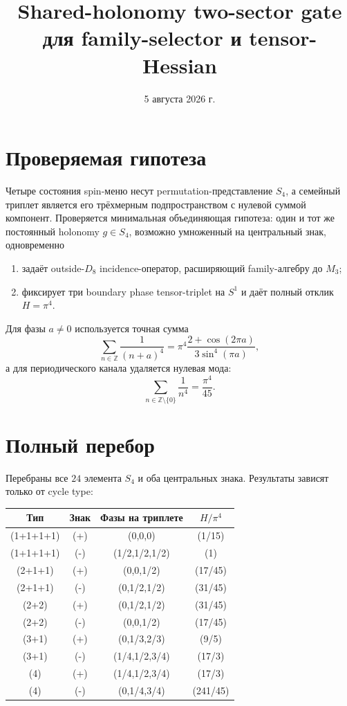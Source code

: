 \documentclass[12pt,a4paper]{article}
\title{Shared-holonomy two-sector gate\\
для family-selector и tensor-Hessian}
\author{}
\date{5 августа 2026 г.}
\begin{document}
\maketitle

\section{Проверяемая гипотеза}

Четыре состояния spin-меню несут permutation-представление \(S_4\), а
семейный триплет является его трёхмерным подпространством с нулевой суммой
компонент. Проверяется минимальная объединяющая гипотеза: один и тот же
постоянный holonomy \(g\in S_4\), возможно умноженный на центральный знак,
одновременно
\begin{enumerate}
    \item задаёт outside-\(D_8\) incidence-оператор, расширяющий family-алгебру
    до \(M_3\);
    \item фиксирует три boundary phase tensor-triplet на \(S^1\) и даёт
    полный отклик \(H=\pi^4\).
\end{enumerate}

Для фазы \(a\ne0\) используется точная сумма
\begin{equation}
 \sum_{n\in\mathbb Z}\frac1{(n+a)^4}
 =\pi^4\frac{2+\cos(2\pi a)}{3\sin^4(\pi a)},
\end{equation}
а для периодического канала удаляется нулевая мода:
\begin{equation}
 \sum_{n\in\mathbb Z\setminus\{0\}}\frac1{n^4}=\frac{\pi^4}{45}.
\end{equation}

\section{Полный перебор}

Перебраны все \(24\) элемента \(S_4\) и оба центральных знака. Результаты
зависят только от cycle type:
\begin{center}
\begin{tabular}{cccc}
\toprule
Тип & Знак & Фазы на триплете & \(H/\pi^4\) \\
\midrule
(1+1+1+1) & (+) & (0,0,0) & (1/15) \\
(1+1+1+1) & (-) & (1/2,1/2,1/2) & (1) \\
(2+1+1) & (+) & (0,0,1/2) & (17/45) \\
(2+1+1) & (-) & (0,1/2,1/2) & (31/45) \\
(2+2) & (+) & (0,1/2,1/2) & (31/45) \\
(2+2) & (-) & (0,0,1/2) & (17/45) \\
(3+1) & (+) & (0,1/3,2/3) & (9/5) \\
(3+1) & (-) & (1/4,1/2,3/4) & (17/3) \\
(4) & (+) & (1/4,1/2,3/4) & (17/3) \\
(4) & (-) & (0,1/4,3/4) & (241/45) \\
\bottomrule
\end{tabular}
\end{center}
\end{document}
